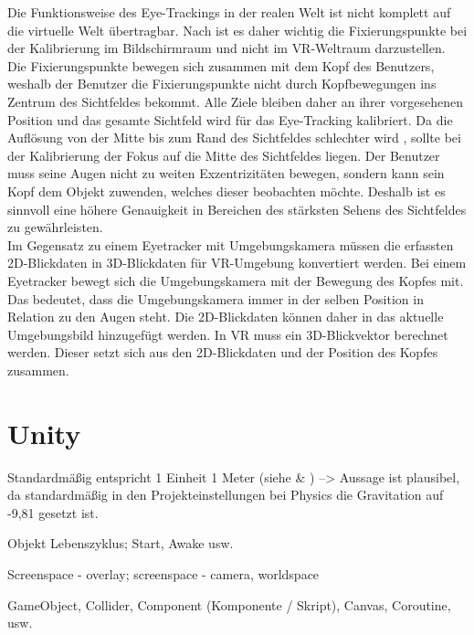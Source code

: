 Die Funktionsweise des Eye-Trackings in der realen Welt ist nicht komplett auf die virtuelle Welt übertragbar. Nach \citeauthor{Clay_Koenig_Koenig_2019} ist es daher wichtig die Fixierungspunkte bei der Kalibrierung im Bildschirmraum und nicht im \ac{VR}-Weltraum darzustellen. Die Fixierungspunkte bewegen sich zusammen mit dem Kopf des Benutzers, weshalb der Benutzer die Fixierungspunkte nicht durch Kopfbewegungen ins Zentrum des Sichtfeldes bekommt. Alle Ziele bleiben daher an ihrer vorgesehenen Position und das gesamte Sichtfeld wird für das Eye-Tracking kalibriert. Da die Auflösung von der Mitte bis zum Rand des Sichtfeldes schlechter wird \cite{Kreylos.2017}, sollte bei der Kalibrierung der Fokus auf die Mitte des Sichtfeldes liegen. Der Benutzer muss seine Augen nicht zu weiten Exzentrizitäten bewegen, sondern kann sein Kopf dem Objekt zuwenden, welches dieser beobachten möchte. Deshalb ist es sinnvoll eine höhere Genauigkeit in Bereichen des stärksten Sehens des Sichtfeldes zu gewährleisten. \cite{Clay_Koenig_Koenig_2019} \\ 
Im Gegensatz zu einem Eyetracker mit Umgebungskamera müssen die erfassten 2D-Blickdaten in 3D-Blickdaten für \ac{VR}-Umgebung konvertiert werden. Bei einem Eyetracker bewegt sich die Umgebungskamera mit der Bewegung des Kopfes mit. Das bedeutet, dass die Umgebungskamera immer in der selben Position in Relation zu den Augen steht. Die 2D-Blickdaten können daher in das aktuelle Umgebungsbild hinzugefügt werden. In \ac{VR} muss ein 3D-Blickvektor berechnet werden. Dieser setzt sich aus den 2D-Blickdaten und der Position des Kopfes zusammen. \cite{Clay_Koenig_Koenig_2019}

\section{Unity}
Standardmäßig entspricht 1 Einheit 1 Meter (siehe \cite{BrentAllard.2017} \& \cite{AVividLight.2010}) --> Aussage ist plausibel, da standardmäßig in den Projekteinstellungen bei Physics die Gravitation auf -9,81 gesetzt ist.

Objekt Lebenszyklus; Start, Awake usw.

Screenspace - overlay; screenspace - camera, worldspace

GameObject, Collider, Component (Komponente / Skript), Canvas, Coroutine, usw.

